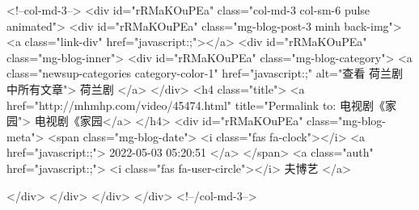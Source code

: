                        <!--col-md-3-->
                        <div id="rRMaKOuPEa"  class="col-md-3 col-sm-6 pulse animated">
                            <div id="rRMaKOuPEa"  class="mg-blog-post-3 minh back-img">
                                <a class="link-div" href="javascript:;"></a>
                                <div id="rRMaKOuPEa"  class="mg-blog-inner">
                                    <div id="rRMaKOuPEa"  class="mg-blog-category">
                                        <a class="newsup-categories category-color-1" href="javascript:;" alt="查看 荷兰剧 中所有文章">
                                            荷兰剧
                                        </a>
                                    </div>
                                    <h4 class="title"> <a href="http://mhmhp.com/video/45474.html" title="Permalink to: 电视剧《家园"> 电视剧《家园</a> </h4>
                                    <div id="rRMaKOuPEa"  class="mg-blog-meta">
                                        <span class="mg-blog-date">
                                            <i class="fas fa-clock"></i>
                                            <a href="javascript:;">
                                                2022-05-03 05:20:51
                                            </a>
                                        </span>
                                        <a class="auth" href="javascript:;">
                                            <i class="fas fa-user-circle"></i>
                                            夫博艺
                                        </a>

                                    </div>
                                </div>
                            </div>
                        </div>
                        <!--/col-md-3-->
                        
